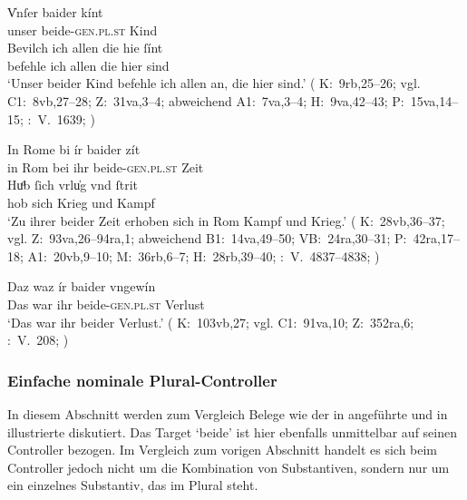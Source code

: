 \begin{exe}
\ex \label{ex:k_beider}
	\begin{xlist}
	\ex \label{ex:k_beider_1}
		\gll V̍nſer baider kínt \\
			unser beide-\textsc{gen.pl.st} Kind \\
	\sn \gll Bevilch ich allen die hie ſínt \\
			befehle ich allen die hier sind \\
		\trans `Unser beider Kind befehle ich allen an, die hier sind.'
			(%
				K:~9rb,25--26; vgl.
				C1:~8vb,27--28;
				Z:~31va,3--4; abweichend
				A1:~7va,3--4;
				H:~9va,42--43;
				P:~15va,14--15;
				\KC:~V.~1639;
				\cite[111]{schroeder1895}%
			)

	\ex \label{ex:k_beider_2}
		\gll In Rome bi ír baider zít \\
			in Rom bei ihr beide-\textsc{gen.pl.st} Zeit \\
	\sn \gll Huͦb ſich vrlu̍g vnd ſtrit \\
			hob sich Krieg und Kampf \\
		\trans `Zu ihrer beider Zeit erhoben sich in Rom Kampf und Krieg.'
			(%
				K:~28vb,36--37; vgl.
				Z:~93va,26--94ra,1; abweichend
				B1:~14va,49--50;
				VB:~24ra,30--31;
				P:~42ra,17--18;
				A1:~20vb,9--10;
				M:~36rb,6--7;
				H:~28rb,39--40;
				\KC:~V.~4837--4838;
				\cite[170]{schroeder1895}%
			)

	\ex \label{ex:k_beider_3}
		\gll Daz waz ír baider vngewín \\
			Das war ihr beide-\textsc{gen.pl.st} Verlust \\
		\trans `Das war ihr beider Verlust.'
			(%
				K:~103vb,27; vgl.
				C1:~91va,10;
				Z:~352ra,6;
				\KC:~V.~208;
				\cite[83]{schroeder1895}%
			)
	\end{xlist}
\end{exe}

\subsubsection{Einfache nominale Plural-Controller}
\label{subsubsec:nomctrlpers}

In diesem Abschnitt werden zum Vergleich Belege wie der in
 angeführte und in  illustrierte
diskutiert. Das Target  `beide' ist hier ebenfalls unmittelbar auf
seinen Controller bezogen. Im Vergleich zum vorigen Abschnitt handelt es sich
beim Controller jedoch nicht um die Kombination von Substantiven, sondern nur
um ein einzelnes Substantiv, das im Plural steht.

